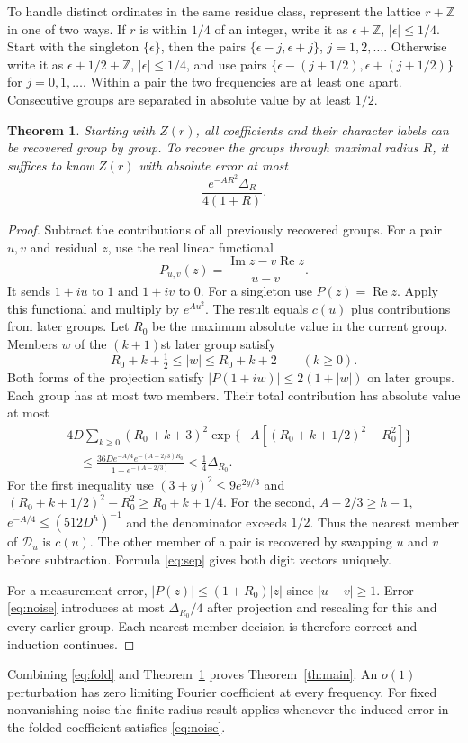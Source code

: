 \documentclass[11pt]{article}
\newtheorem{theorem}{Theorem}\newtheorem{lemma}[theorem]{Lemma}
\newcommand{\Z}{\mathbb Z}\newcommand{\R}{\mathbb R}
\newcommand{\re}{\operatorname{Re}}\newcommand{\im}{\operatorname{Im}}
\begin{document}
To handle distinct ordinates in the same residue class, represent the lattice $r+\Z$ in one of two ways. If $r$ is within $1/4$ of an integer, write it as $\epsilon+\Z$, $|\epsilon|\le1/4$. Start with the singleton $\{\epsilon\}$, then the pairs $\{\epsilon-j,\epsilon+j\}$, $j=1,2,\ldots$. Otherwise write it as $\epsilon+1/2+\Z$, $|\epsilon|\le1/4$, and use pairs $\{\epsilon-(j+1/2),\epsilon+(j+1/2)\}$ for $j=0,1,\ldots$. Within a pair the two frequencies are at least one apart. Consecutive groups are separated in absolute value by at least $1/2$.
\begin{theorem}\label{th:unfold}
Starting with $Z(r)$, all coefficients and their character labels can be recovered group by group. To recover the groups through maximal radius $R$, it suffices to know $Z(r)$ with absolute error at most
\begin{equation}
 \frac{e^{-AR^2}\Delta_R}{4(1+R)}.\label{eq:noise}
\end{equation}
\end{theorem}
\begin{proof}
Subtract the contributions of all previously recovered groups. For a pair $u,v$ and residual $z$, use the real linear functional
\[
 P_{u,v}(z)=\frac{\im z-v\re z}{u-v}.
\]
It sends $1+iu$ to $1$ and $1+iv$ to $0$. For a singleton use $P(z)=\re z$. Apply this functional and multiply by $e^{Au^2}$. The result equals $c(u)$ plus contributions from later groups. Let $R_0$ be the maximum absolute value in the current group. Members $w$ of the $(k+1)$st later group satisfy
\[
 R_0+k+\tfrac12\le|w|\le R_0+k+2\qquad(k\ge0).
\]
Both forms of the projection satisfy $|P(1+iw)|\le 2(1+|w|)$ on later groups. Each group has at most two members. Their total contribution has absolute value at most
\begin{align*}
 &4D\sum_{k\ge0}(R_0+k+3)^2
 \exp\{-A[(R_0+k+1/2)^2-R_0^2]\}\\
 &\hspace{1em}\le \frac{36D e^{-A/4}e^{-(A-2/3)R_0}}{1-e^{-(A-2/3)}}
 <\tfrac14\Delta_{R_0}.
\end{align*}
For the first inequality use $(3+y)^2\le9e^{2y/3}$ and $(R_0+k+1/2)^2-R_0^2\ge R_0+k+1/4$. For the second, $A-2/3\ge h-1$, $e^{-A/4}\le(512D^h)^{-1}$ and the denominator exceeds $1/2$. Thus the nearest member of $\mathcal D_u$ is $c(u)$. The other member of a pair is recovered by swapping $u$ and $v$ before subtraction. Formula \eqref{eq:sep} gives both digit vectors uniquely.

For a measurement error, $|P(z)|\le (1+R_0)|z|$ since $|u-v|\ge1$. Error \eqref{eq:noise} introduces at most $\Delta_{R_0}/4$ after projection and rescaling for this and every earlier group. Each nearest-member decision is therefore correct and induction continues.
\end{proof}
Combining \eqref{eq:fold} and Theorem~\ref{th:unfold} proves Theorem~\ref{th:main}. An $o(1)$ perturbation has zero limiting Fourier coefficient at every frequency. For fixed nonvanishing noise the finite-radius result applies whenever the induced error in the folded coefficient satisfies \eqref{eq:noise}.
\end{document}
